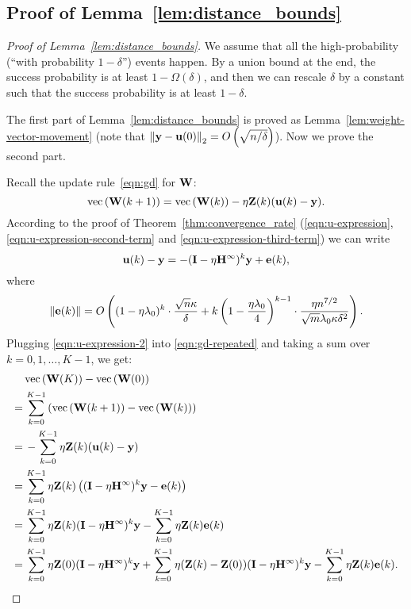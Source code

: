 


\subsection{Proof of Lemma~\ref{lem:distance_bounds}} \label{app:proof-lem:distance_bounds}

\begin{proof}[Proof of Lemma~\ref{lem:distance_bounds}]
	We assume that all the high-probability (``with probability $1-\delta$'') events happen. By a union bound at the end, the success probability is at least $1-\Omega(\delta)$, and then we can rescale $\delta$ by a constant such that the success probability is at least $1-\delta$.
	
	The first part of Lemma~\ref{lem:distance_bounds} is proved as Lemma~\ref{lem:weight-vector-movement} (note that $\left\|\mathbf{y} - \mathbf{u}(0)\right\|_2 = O\left( \sqrt{n/\delta} \right)$). Now we prove the second part.
	
	Recall the update rule~\eqref{eqn:gd} for $\mathbf{W}$:
	\begin{equation} \label{eqn:gd-repeated}
	\text{vec}\left(\mathbf{W}(k+1)\right) = \text{vec}\left(\mathbf{W}(k)\right) - \eta \mathbf{Z}(k) (\mathbf{u}(k) - \mathbf{y}).
	\end{equation}
	According to the proof of Theorem~\ref{thm:convergence_rate} (\eqref{eqn:u-expression}, \eqref{eqn:u-expression-second-term} and \eqref{eqn:u-expression-third-term}) we can write
	\begin{equation} \label{eqn:u-expression-2}
	\mathbf{u}(k) - \mathbf{y} = -(\mathbf{I} - \eta \mathbf{H}^\infty)^k \mathbf{y} + \mathbf{e}(k),
	\end{equation}
	where
	\begin{equation} \label{eqn:e(k)-bound}
	\left\|\mathbf{e}(k)\right\| = O\left(  (1-\eta \lambda_0)^k \cdot \frac{\sqrt n \kappa}{ \delta}  + k\left(1-\frac{\eta \lambda_0}{4}\right)^{k-1}\cdot \frac{\eta n^{7/2}}{\sqrt m \lambda_0 \kappa \delta^{2}}  \right).
	\end{equation}
	Plugging \eqref{eqn:u-expression-2} into \eqref{eqn:gd-repeated} and taking a sum over $k = 0, 1, \ldots, K-1$, we get:
	\begin{equation} \label{eqn:W-movement}
	\begin{aligned}
	&\text{vec}\left(\mathbf{W}(K)\right) - \text{vec}\left(\mathbf{W}(0)\right) \\
	=\,& \sum_{k=0}^{K-1} \left( \text{vec}\left(\mathbf{W}(k+1)\right) - \text{vec}\left(\mathbf{W}(k)\right)  \right) \\
	=\,& - \sum_{k=0}^{K-1} \eta \mathbf{Z}(k) (\mathbf{u}(k) - \mathbf{y}) \\
	=\,&  \sum_{k=0}^{K-1} \eta \mathbf{Z}(k) \left((\mathbf{I} - \eta \mathbf{H}^\infty)^k \mathbf{y} - \mathbf{e}(k)\right) \\
	=\,&  \sum_{k=0}^{K-1} \eta \mathbf{Z}(k) (\mathbf{I} - \eta \mathbf{H}^\infty)^k \mathbf{y}  - \sum_{k=0}^{K-1} \eta \mathbf{Z}(k) \mathbf{e}(k) \\
	=\,&  \sum_{k=0}^{K-1} \eta \mathbf{Z}(0) (\mathbf{I} - \eta \mathbf{H}^\infty)^k \mathbf{y} + \sum_{k=0}^{K-1} \eta (\mathbf{Z}(k) - \mathbf{Z}(0)) (\mathbf{I} - \eta \mathbf{H}^\infty)^k \mathbf{y}  - \sum_{k=0}^{K-1} \eta \mathbf{Z}(k)  \mathbf{e}(k).
	\end{aligned}
	\end{equation}
	

\end{proof}
